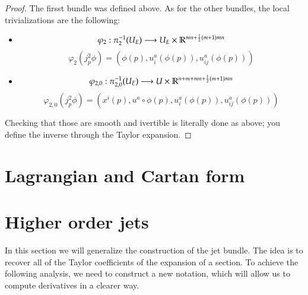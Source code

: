\documentclass[12pt,a4paper]{report}
\theoremstyle{definition}
\theoremstyle{Theorem}
\theoremstyle{break}
\theoremstyle{definition}
\begin{document}
	\begin{proof}
		The firsst bundle was defined above. As for the other bundles, the local trivializations are the following: 
		\begin{itemize}
			\item $$\varphi_2:\pi_2^{-1}(U_E)\longrightarrow U_E\times \mathbb{R}^{mn+{1\over 2}(m+1)mn}$$
			$$\varphi_2(j^2_p\phi)=(\phi(p),u_i^a(\phi(p)),u_{ij}^a(\phi(p)))$$
			\item 
			$$\varphi_{2,0}:\pi_{2,0}^{-1}(U_E)\longrightarrow U\times \mathbb{R}^{n+m+mn+{1\over 2}(m+1)mn}$$
			$$\varphi_{2,0}(j^2_p\phi)=(x^i(p),u^a\circ \phi(p),u_i^a(\phi(p)),u_{ij}^a(\phi(p)))$$		
		\end{itemize}
		Checking that those are smooth and ivertible is literally done as above; you define the inverse through the Taylor expansion.
	\end{proof}
	\section{Lagrangian and Cartan form}
	\section{Higher order jets}
	In this section we will generalize the construction of the jet bundle. The idea is to recover all of the Taylor coefficients of the expansion of a section. To achieve the following analysis, we need to construct a new notation, which will allow us to compute derivatives in a clearer way.
\end{document}
